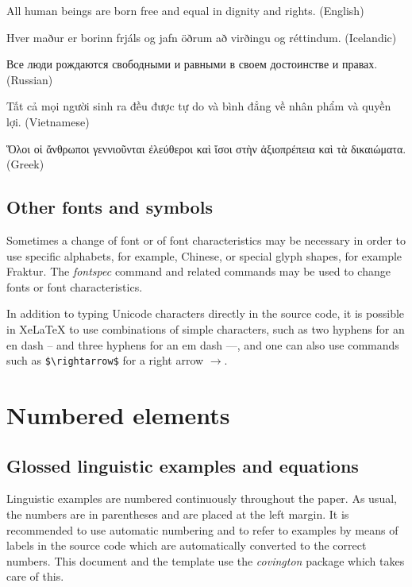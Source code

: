 \documentclass[11pt,twoside]{article}
\begin{document}
\begin{examples}
 \item\label{english} All human beings are born free and equal in dignity and rights. (English)
 \item Hver maður er borinn frjáls og jafn öðrum að virðingu og réttindum. (Icelandic)
 \item Все люди рождаются свободными и равными в своем достоинстве и 
правах. (Russian)
 \item Tất cả mọi người sinh ra đều được tự do và bình đẳng về nhân phẩm và 
quyền lợi. (Vietnamese)
 \item\label{greek} Ὅλοι οἱ ἄνθρωποι γεννιοῦνται ἐλεύθεροι καὶ ἴσοι στὴν ἀξιοπρέπεια 
καὶ τὰ δικαιώματα. (Greek)
\end{examples}

\subsection{Other fonts and symbols}\label{otherfonts}

Sometimes a change of font or of font characteristics may be necessary in order to use specific alphabets, for example, Chinese, or special glyph shapes, for example Fraktur.
The \emph{fontspec} command and related commands may be used to change fonts or font characteristics.

In addition to typing Unicode characters directly in the source code, it is possible in XeLaTeX to use combinations of simple characters, such as two hyphens for an en dash -- and three hyphens for an em dash ---, and one can also use commands such as \verb!$\rightarrow$! for a right arrow $\rightarrow$.

\section{Numbered elements}

\subsection{Glossed linguistic examples and equations}

Linguistic examples are numbered continuously throughout the paper.
As usual, the numbers are in parentheses and are placed at the left margin.
It is recommended to use automatic numbering and to refer to examples by means of labels in the source code which are automatically converted to the correct numbers.
This document and the template use the \emph{covington} package which takes care of this.
\end{document}
